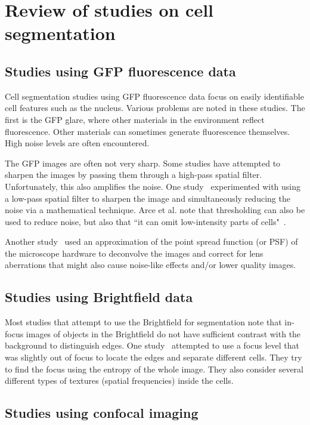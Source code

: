 \section{Review of studies on cell segmentation}

\subsection{Studies using GFP fluorescence data}

Cell segmentation studies using GFP fluorescence data focus on easily identifiable cell features such as the nucleus. Various problems are noted in these studies. The first is the GFP glare, where other materials in the environment reflect fluorescence. Other materials can sometimes generate fluorescence themselves. High noise levels are often encountered.

The GFP images are often not very sharp. Some studies have attempted to sharpen the images by passing them through a high-pass spatial filter. Unfortunately, this also amplifies the noise. One study~\cite{arce} experimented with using a low-pass spatial filter to sharpen the image and simultaneously reducing the noise via a mathematical technique. Arce et al. note that thresholding can also be used to reduce noise, but also that ``it can omit low-intensity parts of cells"~\cite{arce}.

Another study~\cite{rizk} used an approximation of the point spread function (or PSF) of the microscope hardware to deconvolve the images and correct for lens aberrations that might also cause noise-like effects and/or lower quality images.

\subsection{Studies using Brightfield data}

Most studies that attempt to use the Brightfield for segmentation note that in-focus images of objects in the Brightfield do not have sufficient contrast with the background to distinguish edges. One study~\cite{ali} attempted to use a focus level that was slightly out of focus to locate the edges and separate different cells. They try to find the focus using the entropy of the whole image. They also consider several different types of textures (spatial frequencies) inside the cells.

\subsection{Studies using confocal imaging}

